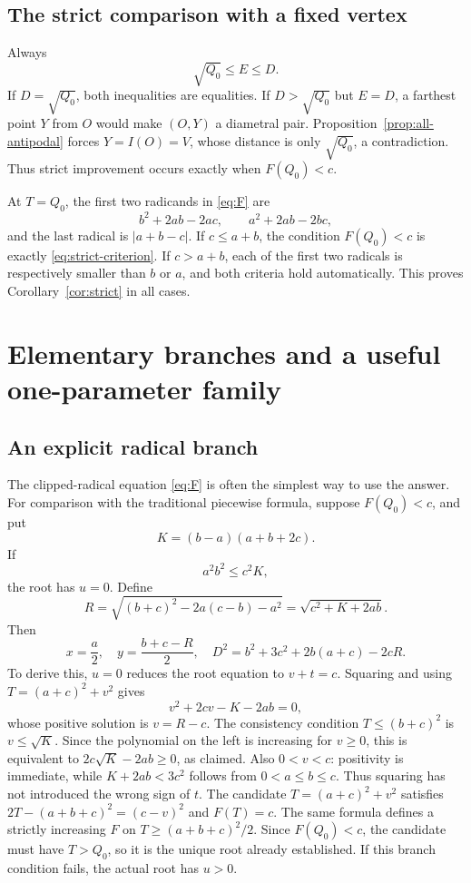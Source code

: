 \documentclass[11pt]{article}
\theoremstyle{definition}
\newcommand{\sqzero}{Q_0}
\newcommand{\vertexecc}{E}
\newcommand{\diameter}{D}
\begin{document}
\subsection{The strict comparison with a fixed vertex}

Always
\[
\sqrt{\sqzero}\le\vertexecc\le\diameter.
\]
If \(\diameter=\sqrt{\sqzero}\), both inequalities are equalities.
If \(\diameter>\sqrt{\sqzero}\) but \(\vertexecc=\diameter\),
a farthest point \(Y\) from \(O\) would make \((O,Y)\) a diametral
pair. Proposition~\ref{prop:all-antipodal} forces \(Y=I(O)=V\),
whose distance is only \(\sqrt{\sqzero}\), a contradiction.
Thus strict improvement occurs exactly when \(F(\sqzero)<c\).

At \(T=\sqzero\), the first two radicands in \eqref{eq:F} are
\[
b^2+2ab-2ac,\qquad a^2+2ab-2bc,
\]
and the last radical is \(|a+b-c|\).
If \(c\le a+b\), the condition \(F(\sqzero)<c\) is exactly
\eqref{eq:strict-criterion}. If \(c>a+b\), each of the first
two radicals is respectively smaller than \(b\) or \(a\), and
both criteria hold automatically. This proves
Corollary~\ref{cor:strict} in all cases.

\section{Elementary branches and a useful one-parameter family}
\label{sec:radicals}

\subsection{An explicit radical branch}

The clipped-radical equation \eqref{eq:F} is often the simplest way
to use the answer. For comparison with the traditional piecewise
formula, suppose \(F(\sqzero)<c\), and put
\[
K=(b-a)(a+b+2c).
\]
If
\[
a^2b^2\le c^2K,
\]
the root has \(u=0\). Define
\[
R=\sqrt{(b+c)^2-2a(c-b)-a^2}
  =\sqrt{c^2+K+2ab}.
\]
Then
\[
\boxed{\ x=\frac a2,\quad y=\frac{b+c-R}{2},\quad
\diameter^2=b^2+3c^2+2b(a+c)-2cR.\ }
\]
To derive this, \(u=0\) reduces the root equation to \(v+t=c\).
Squaring and using \(T=(a+c)^2+v^2\) gives
\[
v^2+2cv-K-2ab=0,
\]
whose positive solution is \(v=R-c\).
The consistency condition \(T\le(b+c)^2\) is \(v\le\sqrt K\).
Since the polynomial on the left is increasing for \(v\ge0\),
this is equivalent to \(2c\sqrt K-2ab\ge0\), as claimed.
Also \(0<v<c\): positivity is immediate, while
\(K+2ab<3c^2\) follows from \(0<a\le b\le c\).
Thus squaring has not introduced the wrong sign of \(t\).
The candidate \(T=(a+c)^2+v^2\) satisfies
\(2T-(a+b+c)^2=(c-v)^2\) and \(F(T)=c\).
The same formula defines a strictly increasing \(F\) on
\(T\ge(a+b+c)^2/2\). Since \(F(\sqzero)<c\), the candidate
must have \(T>\sqzero\), so it is the unique root already established.
If this branch condition fails, the actual root has \(u>0\).
\end{document}
